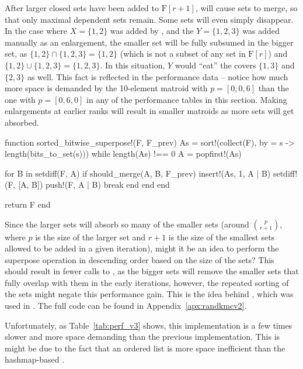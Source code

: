 After larger closed sets have been added to $\mathrm{F}[r+1]$,  will cause sets to merge, so that only maximal dependent sets remain. Some sets will even simply disappear. In the case where $X=\{1,2\}$ was added by , and the $Y=\{1,2,3\}$ was added manually as an enlargement, the smaller set will be fully subsumed in the bigger set, as $\{1,2\}\cap\{1,2,3\}=\{1,2\}$ (which is not a subset of any set in $\mathrm{F}[r]$) and $\{1,2\}\cup\{1,2,3\}=\{1,2,3\}$. In this situation, $Y$ would ``eat'' the covers $\{1,3\}$ and $\{2,3\}$ as well. This fact is reflected in the performance data -- notice how much more space is demanded by the 10-element matroid with $p=[0,0,6]$ than the one with $p=[0,6,0]$ in any of the performance tables in this section. Making enlargements at earlier ranks will result in smaller matroids as more sets will get absorbed.

\begin{jllisting}
function sorted_bitwise_superpose!(F, F_prev)
  As = sort!(collect(F), by = s -> length(bits_to_set(s)))
  while length(As) !== 0
    A = popfirst!(As)

    for B in setdiff(F, A)
      if should_merge(A, B, F_prev)
        insert!(As, 1, A | B)
        setdiff!(F, [A, B])
        push!(F, A | B)
        break
      end
    end
  end

  return F
end
\end{jllisting}

Since the larger sets will absorb so many of the smaller sets (around $\binom{p}{r+1}$, where $p$ is the size of the larger set and $r+1$ is the size of the smallest sets allowed to be added in a given iteration), might it be an idea to perform the superpose operation in descending order based on the size of the sets? This should result in fewer calls to , as the bigger sets will remove the smaller sets that fully overlap with them in the early iterations, however, the repeated sorting of the sets might negate this performance gain. This is the idea behind , which was used in . The full code can be found in Appendix~\ref{apx:randkmcv2}.

Unfortunately, as Table~\ref{tab:perf_v3} shows, this implementation is a few times slower and more space demanding than the previous implementation. This is might be due to the fact that an ordered list is more space inefficient than the hashmap-based .

